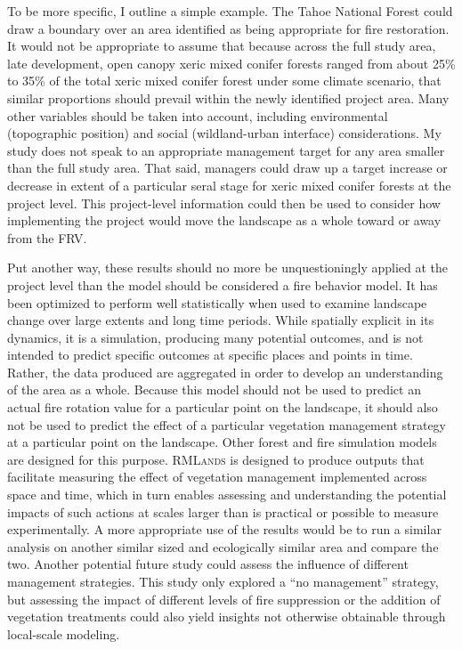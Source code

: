 To be more specific, I outline a simple example. The Tahoe National Forest could draw a boundary over an area identified as being appropriate for fire restoration. It would not be appropriate to assume that because across the full study area, late development, open canopy xeric mixed conifer forests ranged from about 25\% to 35\% of the total xeric mixed conifer forest under some climate scenario, that similar proportions should prevail within the newly identified project area. Many other variables should be taken into account, including environmental (topographic position) and social (wildland-urban interface) considerations. My study does not speak to an appropriate management target for any area smaller than the full study area. That said, managers could draw up a target increase or decrease in extent of a particular seral stage for xeric mixed conifer forests at the project level. This project-level information could then be used to consider how implementing the project would move the landscape as a whole toward or away from the FRV. 

Put another way, these results should no more be unquestioningly applied at the project level than the model should be considered a fire behavior model. It has been optimized to perform well statistically when used to examine landscape change over large extents and long time periods. While spatially explicit in its dynamics, it is a simulation, producing many potential outcomes, and is not intended to predict specific outcomes at specific places and points in time. Rather, the data produced are aggregated in order to develop an understanding of the area as a whole. Because this model should not be used to predict an actual fire rotation value for a particular point on the landscape, it should also not be used to predict the effect of a particular vegetation management strategy at a particular point on the landscape. Other forest and fire simulation models are designed for this purpose. \textsc{RMLands} is designed to produce outputs that facilitate measuring the effect of vegetation management implemented across space and time, which in turn enables assessing and understanding the potential impacts of such actions at scales larger than is practical or possible to measure experimentally.  A more appropriate use of the results would be to run a similar analysis on another similar sized and ecologically similar area and compare the two. Another potential future study could assess the influence of different management strategies. This study only explored a ``no management'' strategy, but assessing the impact of different levels of fire suppression or the addition of vegetation treatments could also yield insights not otherwise obtainable through local-scale modeling.


